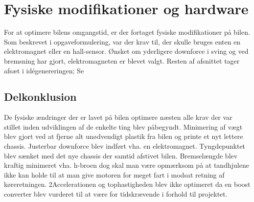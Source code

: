 
\section{Fysiske modifikationer og hardware}

For at optimere bilens omgangstid, er der fortaget fysiske modifikationer på bilen.
Som beskrevet i opgaveformulering, var der krav til, der skulle bruges enten en elektromagnet eller en hall-sensor.
Ønsket om yderligere downforce i sving og ved bremsning har gjort, elektromagneten er blevet valgt.
Resten af afsnittet tager afsæt i idégenereringen; Se








\subsection{Delkonklusion}
De fysiske ændringer der er lavet på bilen optimere næsten alle krav der var stillet inden udviklingen af de enkelte ting blev påbegyndt.
Minimering af vægt blev gjort ved at fjerne alt unødvendigt plastik fra bilen og printe et nyt lettere chassis.
Justerbar downforce blev indført vha. en elektromagnet. Tyngdepunktet blev sænket med det nye chassis der samtid afstivet bilen.
Bremselængde blev kraftig minimeret vha. h-broen dog skal man være opmærksom på at tandhjulene ikke kan holde til at man give motoren for meget fart i modsat retning af køreretningen.
2Accelerationen og tophastigheden blev ikke optimeret da en boost converter blev vurderet til at være for tidskrævende i forhold til projektet.
